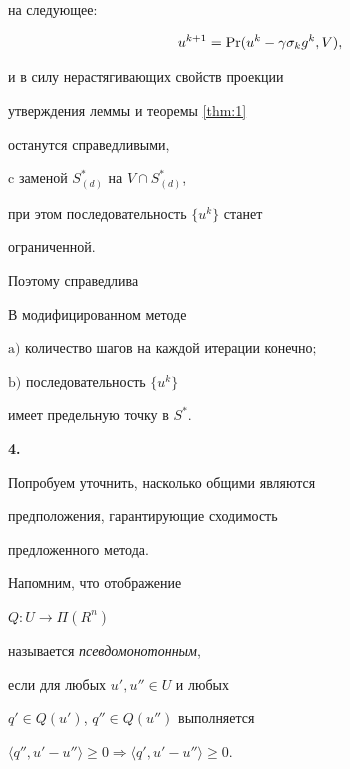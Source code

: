 на следующее:


$$


u^{k+1}=\Pro (u^{k}- \gamma \sigma _{k} g^{k},V),


$$


и в силу нерастягивающих свойств проекции


утверждения леммы и теоремы \ref{thm:1}


останутся справедливыми,


c заменой $S^{*}_{(d)}$ на $V \cap S^{*}_{(d)}$,


при этом последовательность $ \{ u^{k} \}$ станет


ограниченной.


Поэтому справедлива








\begin{thm}


\label{thm:2}


В модифицированном методе





$\mathrm{a)}$ количество шагов на каждой итерации конечно$;$





$\mathrm{b)}$ последовательность $\{ u^{k}\}$


имеет предельную точку в $ S^{*}$.


\end{thm}





{\bf 4.}


Попробуем уточнить, насколько общими являются


предположения, гарантирующие сходимость


предложенного метода.


Напомним, что отображение


$Q:U \longrightarrow \Pi (R^{n})$


называется {\it псевдомонотонным},


если для любых $u',u'' \in U$ и любых


$q' \in Q(u')$, $q'' \in Q(u'')$ выполняется


$ \langle q'', u'-u'' \rangle \geq 0


\Longrightarrow \langle q', u'-u'' \rangle \geq 0$.








